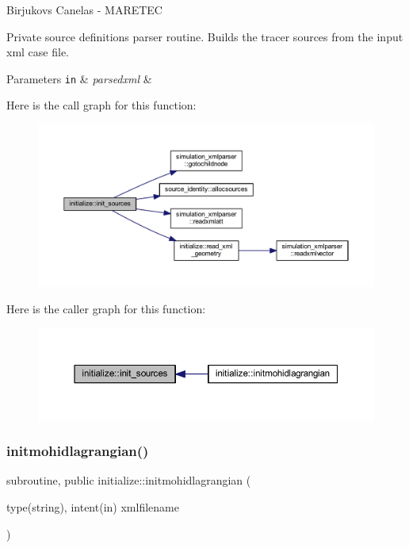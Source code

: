 Birjukovs Canelas -\/ M\+A\+R\+E\+T\+EC 

Private source definitions parser routine. Builds the tracer sources from the input xml case file. 
\begin{DoxyParams}[1]{Parameters}
\mbox{\tt in}  & {\em parsedxml} & \\
\hline
\end{DoxyParams}
Here is the call graph for this function\+:
\nopagebreak
\begin{figure}[H]
\begin{center}
\leavevmode
\includegraphics[width=350pt]{namespaceinitialize_a9ed75476e5dd07928aed3442281930be_cgraph}
\end{center}
\end{figure}
Here is the caller graph for this function\+:
\nopagebreak
\begin{figure}[H]
\begin{center}
\leavevmode
\includegraphics[width=350pt]{namespaceinitialize_a9ed75476e5dd07928aed3442281930be_icgraph}
\end{center}
\end{figure}
\mbox{\label{namespaceinitialize_a45b7ca20c45cf272acbc391950cbb804}} 
\subsubsection{\texorpdfstring{initmohidlagrangian()}{initmohidlagrangian()}}
{\footnotesize\ttfamily subroutine, public initialize\+::initmohidlagrangian (\begin{DoxyParamCaption}\item[{type(string), intent(in)}]{xmlfilename }\end{DoxyParamCaption})}



